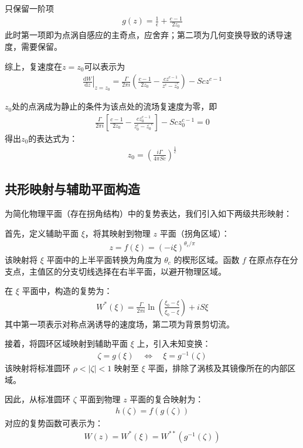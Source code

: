 只保留一阶项
\begin{align}
    g(z)=\frac{1}{\epsilon}+\frac{c-1}{2z_{0}}
\end{align}
此时第一项即为点涡自感应的主奇点，应舍弃；第二项为几何变换导致的诱导速度，需要保留。

综上，复速度在$z=z_{0}$可以表示为
\begin{align}
    \left.\frac{\mathrm{d}W}{\mathrm{d}z}\right|_{z=z_{0}}=\frac{\Gamma}{2\pi i}\left(\frac{c-1}{2z_{0}}-\frac{cz^{c-1}}{z^{c}-\bar{z}_{0}^{c}}\right)-Scz^{c-1}
\end{align}


$z_{0}$处的点涡成为静止的条件为该点处的流场复速度为零，即
\begin{align}
    \frac{\Gamma}{2\pi i}\left[\frac{c-1}{2z_{0}}-\frac{cz_{0}^{c-1}}{z_{0}^{c}-\bar{z_{0}}^{c}}\right]-Scz_{0}^{c-1}=0
\end{align}
得出$z_{0}$的表达式为：
\begin{align}
    z_{0}=\left(\frac{i\Gamma}{4\pi Sc}\right)^{\frac{1}{c}}
\end{align}

\subsection{共形映射与辅助平面构造}

为简化物理平面（存在拐角结构）中的复势表达，我们引入如下两级共形映射：

首先，定义辅助平面 $\xi$，将其映射到物理 $z$ 平面（拐角区域）：
\begin{align}
    z = f(\xi) = (-i\xi)^{\theta_c/\pi}
\end{align}
该映射将 $\xi$ 平面中的上半平面转换为角度为 $\theta_c$ 的楔形区域。函数 $f$ 在原点存在分支点，主值区的分支切线选择在右半平面，以避开物理区域。

在 $\xi$ 平面中，构造的复势为：
\begin{align}
    W^{*}(\xi) = \frac{\Gamma}{2\pi i}\ln\left(\frac{\xi_0 - \xi}{\bar{\xi}_0 - \xi}\right) + iS\xi
\end{align}
其中第一项表示对称点涡诱导的速度场，第二项为背景剪切流。

接着，将圆环区域映射到辅助平面 $\xi$ 上，引入未知变换：
\begin{align}
    \zeta = g(\xi) \quad \Leftrightarrow \quad \xi = g^{-1}(\zeta)
\end{align}
该映射将标准圆环 $\rho < |\zeta| < 1$ 映射至 $\xi$ 平面，排除了涡核及其镜像所在的内部区域。

因此，从标准圆环 $\zeta$ 平面到物理 $z$ 平面的复合映射为：
\begin{align}
    h(\zeta) = f(g(\zeta))
\end{align}
对应的复势函数可表示为：
\begin{align}
    W(z) = W^{*}(\xi) = W^{**}(g^{-1}(\zeta))
\end{align}






